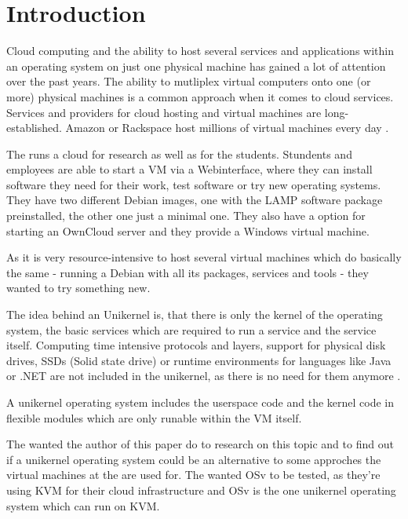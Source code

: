\chapter{Introduction}

    Cloud computing and the ability to host several services and
    applications within an operating system on just one physical machine has
    gained a lot of attention over the past years. The ability to mutliplex
    virtual computers onto one (or more) physical machines is a common approach
    when it comes to cloud services. Services and providers for cloud hosting
    and virtual machines are long-established. Amazon or Rackspace host millions
    of virtual machines every day \cite[S. 1]{unikernels}.

    The \HFU{} runs a cloud for research as well as for the students. Stundents
    and employees are able to start a VM via a Webinterface, where they can
    install software they need for their work, test software or try new
    operating systems. They have two different Debian images, one with the LAMP
    software package preinstalled, the other one just a minimal one. They also
    have a option for starting an OwnCloud server and they provide a Windows
    virtual machine.

    As it is very resource-intensive to host several virtual machines which do
    basically the same - running a Debian with all its packages, services and
    tools - they wanted to try something new.

    The idea behind an Unikernel is, that there is only the kernel of the
    operating system, the basic services which are required to run a service and
    the service itself. Computing time intensive protocols and layers, support
    for physical disk drives, SSDs (Solid state drive) or runtime environments
    for languages like Java or .NET are not included in the unikernel, as there
    is no need for them anymore \cite[S. 1]{unikernels}.

    A unikernel operating system includes the userspace code and the kernel code
    in flexible modules which are only runable within the VM itself.

    The \HFU wanted the author of this paper do to research on this topic and to
    find out if a unikernel operating system could be an alternative to some
    approches the virtual machines at the \HFU are used for. The \HFU wanted OSv
    to be tested, as they're using KVM for their cloud infrastructure and OSv is
    the one unikernel operating system which can run on KVM.

